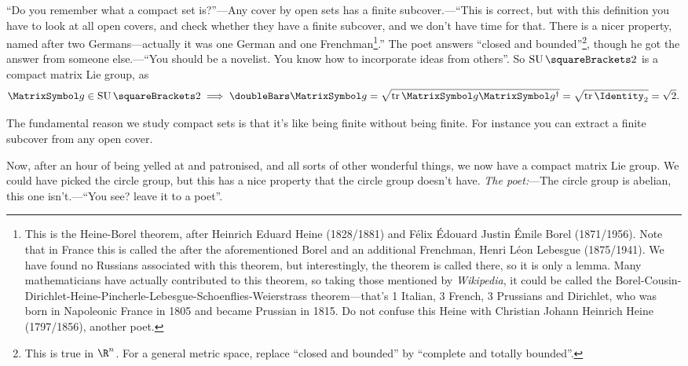 \documentclass[10pt, a4paper, twoside]{lecturenotes}
\newcommand{\Rn}{{\R^n}}
\begin{document}
``Do you remember what a compact set is?''---Any cover by open sets has a finite subcover.---``This is correct, but with this definition you have to look at all open covers, and check whether they have a finite subcover, and we don't have time for that. There is a nicer property, named after two Germans---actually it was one German and one Frenchman\footnote{This is the Heine-Borel theorem, after Heinrich Eduard Heine (1828/1881) and Félix Édouard Justin Émile Borel (1871/1956). Note that in France this is called the  after the aforementioned Borel and an additional Frenchman, Henri Léon Lebesgue (1875/1941). We have found no Russians associated with this theorem, but interestingly, the theorem is called  there, so it is only a lemma. Many mathematicians have actually contributed to this theorem, so taking those mentioned by \emph{Wikipedia}, it could be called the Borel-Cousin-Dirichlet-Heine-Pincherle-Lebesgue-Schoenflies-Weierstrass theorem---that's 1 Italian, 3 French, 3 Prussians and Dirichlet, who was born in Napoleonic France in 1805 and became  Prussian in 1815. Do not confuse this Heine with Christian Johann Heinrich Heine (1797/1856), another poet.}.'' The poet answers ``closed and bounded''\footnote{This is true in $\Rn$. For a general metric space, replace ``closed and bounded'' by ``complete and totally bounded''.}, though he got the answer from someone else.---``You should be a novelist. You know how to incorporate ideas from others''. So $\SpecialUnitaryGroup\of{2}$ is a compact matrix Lie group, as \[
\matg\in\SpecialUnitaryGroup\of 2 \Implies \FrobeniusNorm\matg = \sqrt{\Trace \matg\adj\matg} = \sqrt{\Trace \Identity_2} = \sqrt{2}\text.
\]

The fundamental reason we study compact sets is that it's like being finite without being finite. For instance you can extract a finite subcover from any open cover.

Now, after an hour of being yelled at and patronised, and all sorts of other wonderful things,  we now have a compact matrix Lie group. We could have picked the circle group, but this has a nice property that the circle group doesn't have. \emph{The poet:}---The circle group is abelian, this one isn't.---``You see? leave it to a poet''.
\end{document}
